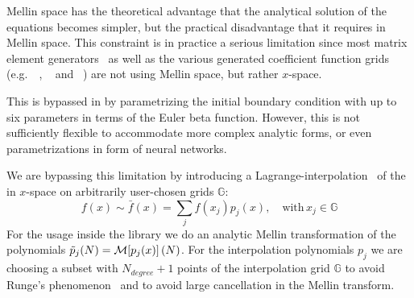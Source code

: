 Mellin space has the theoretical advantage that the analytical solution of the
equations becomes simpler, but the practical disadvantage that it requires
\pdfs in Mellin space. 
This constraint is in practice a serious limitation since most matrix element
generators~\cite{Buckley:2011ms} as well as the various generated coefficient
function grids (e.g.\ \pineappl{}~\cite{Carrazza_2020,christopher_schwan_2022_5846421},
\appl{}~\cite{Carli:2010rw} and \fastnlo{}~\cite{Britzger:2012bs}) are not
using Mellin space, but rather $x$-space.

This is bypassed in \pegasus{} by parametrizing the initial boundary condition
with up to six parameters in terms of the Euler beta function.
However, this is not sufficiently flexible to accommodate more complex analytic
forms, or even parametrizations in form of neural networks.

We are bypassing this limitation by introducing a Lagrange-interpolation~\cite{LagrangeInterpol,suli2003introduction} of the
\pdfs in $x$-space on arbitrarily user-chosen grids $\mathbb G$:
\begin{equation}
    f(x) \sim \bar f(x) = \sum_{j} f(x_j) p_j(x),  \quad \text{with}\,x_j\in \mathbb G
\end{equation}
For the usage inside the library we do an analytic Mellin transformation of the polynomials $\tilde p_j(N) = \mathcal{M}\qty[p_j(x)](N)$.
For the interpolation polynomials $p_j$ we are choosing a subset with $N_{degree} + 1$ points of the interpolation grid $\mathbb G$
to avoid Runge's phenomenon~\cite{zbMATH02662492,suli2003introduction} and to avoid large cancellation in the Mellin transform.
